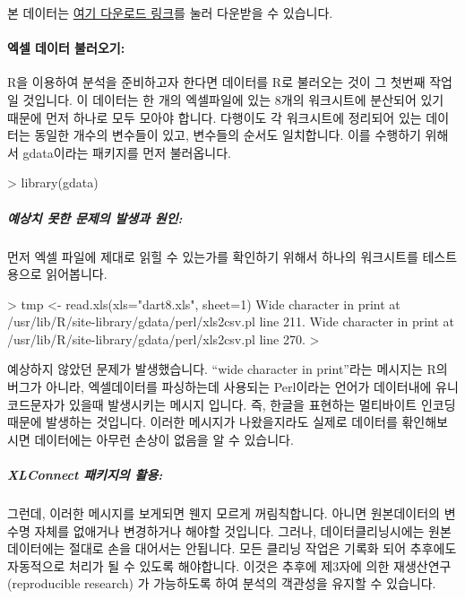 \documentclass[tutorial.tex]{subfiles}
\begin{document}
본 데이터는 \href{http://korea.gnu.org/gnustats/dataset/dart8.xls}{여기 다운로드 링크}를 눌러 다운받을 수 있습니다.

\paragraph{엑셀 데이터 불러오기:}  
R을 이용하여 분석을 준비하고자 한다면 데이터를 R로 불러오는 것이 그 첫번째 작업일 것입니다.
이 데이터는 한 개의 엑셀파일에 있는 8개의 워크시트에 분산되어 있기 때문에 먼저 하나로 모두 모아야 합니다.
다행이도 각 워크시트에 정리되어 있는 데이터는 동일한 개수의 변수들이 있고, 변수들의 순서도 일치합니다.
이를 수행하기 위해서 gdata이라는 패키지를 먼저 불러옵니다.

\begin{Schunk}
\begin{Soutput}
> library(gdata)
\end{Soutput}
\end{Schunk}

\subparagraph{예상치 못한 문제의 발생과 원인:} 
먼저 엑셀 파일에 제대로 읽힐 수 있는가를 확인하기 위해서 하나의 워크시트를 테스트용으로 읽어봅니다.

\begin{Schunk}
\begin{Soutput}
> tmp <- read.xls(xls="dart8.xls", sheet=1)
Wide character in print at /usr/lib/R/site-library/gdata/perl/xls2csv.pl line 211.
Wide character in print at /usr/lib/R/site-library/gdata/perl/xls2csv.pl line 270.
> 
\end{Soutput}
\end{Schunk}

예상하지 않았던 문제가 발생했습니다. 
``wide character in print''라는 메시지는 R의 버그가 아니라, 엑셀데이터를 파싱하는데 사용되는 Perl이라는  언어가 데이터내에 유니코드문자가 있을때 발생시키는 메시지 입니다.
즉, 한글을 표현하는 멀티바이트 인코딩 때문에 발생하는 것입니다.
이러한 메시지가 나왔을지라도 실제로 데이터를 홖인해보시면 데이터에는 아무런 손상이 없음을 알 수 있습니다.


\subparagraph{XLConnect 패키지의 활용:}
그런데, 이러한 메시지를 보게되면 웬지 모르게 꺼림칙합니다. 
아니면 원본데이터의 변수명 자체를 없애거나 변경하거나 해야할 것입니다.
그러나, 데이터클리닝시에는 원본 데이터에는 절대로 손을 대어서는 안됩니다.
모든 클리닝 작업은 기록화 되어 추후에도 자동적으로 처리가 될 수 있도록 해야합니다.
이것은 추후에 제3자에 의한 재생산연구(reproducible research) 가 가능하도록 하여 분석의 객관성을 유지할 수 있습니다.
\end{document}
